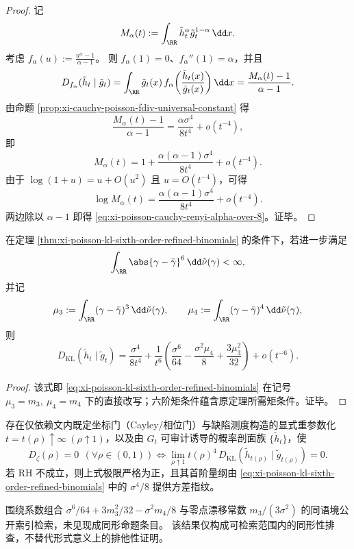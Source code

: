 \begin{proof}
记
\[
M_\alpha(t):=\int_{\RR}\tilde h_t^\alpha\tilde g_t^{1-\alpha}\,\dd x.
\]
考虑 \(f_\alpha(u):=\frac{u^\alpha-1}{\alpha-1}\)。
则 \(f_\alpha(1)=0\)、\(f_\alpha''(1)=\alpha\)，并且
\[
D_{f_\alpha}(\tilde h_t\mid \tilde g_t)
=\int_{\RR}\tilde g_t(x)\,f_\alpha\!\left(\frac{\tilde h_t(x)}{\tilde g_t(x)}\right)\dd x
=\frac{M_\alpha(t)-1}{\alpha-1}.
\]
由命题 \ref{prop:xi-cauchy-poisson-fdiv-universal-constant} 得
\[
\frac{M_\alpha(t)-1}{\alpha-1}
=\frac{\alpha\sigma^4}{8t^4}+o(t^{-4}),
\]
即
\[
M_\alpha(t)=1+\frac{\alpha(\alpha-1)\sigma^4}{8t^4}+o(t^{-4}).
\]
由于 \(\log(1+u)=u+O(u^2)\) 且 \(u=O(t^{-4})\)，可得
\[
\log M_\alpha(t)
=\frac{\alpha(\alpha-1)\sigma^4}{8t^4}+o(t^{-4}).
\]
两边除以 \(\alpha-1\) 即得 \eqref{eq:xi-poisson-cauchy-renyi-alpha-over-8}。证毕。
\end{proof}

\begin{corollary}[KL 六阶精化的中心矩记号重写]\label{cor:xi-poisson-cauchy-kl-tminus6-mu34-form}
在定理 \ref{thm:xi-poisson-kl-sixth-order-refined-binomials} 的条件下，若进一步满足
\[
\int_{\RR}\abs{\gamma-\bar\gamma}^6\,\dd\tilde\nu(\gamma)<\infty,
\]
并记
\[
\mu_3:=\int_{\RR}(\gamma-\bar\gamma)^3\,\dd\tilde\nu(\gamma),\qquad
\mu_4:=\int_{\RR}(\gamma-\bar\gamma)^4\,\dd\tilde\nu(\gamma),
\]
则
\begin{equation}\label{eq:xi-poisson-cauchy-kl-tminus6-mu34-form}
D_{\mathrm{KL}}(\tilde h_t\mid \tilde g_t)
=\frac{\sigma^4}{8t^4}
+\frac{1}{t^6}\left(
\frac{\sigma^6}{64}
-\frac{\sigma^2\mu_4}{8}
+\frac{3\mu_3^2}{32}
\right)
+o(t^{-6}).
\end{equation}
\end{corollary}

\begin{proof}
该式即 \eqref{eq:xi-poisson-kl-sixth-order-refined-binomials} 在记号
\(
\mu_3=m_3,\ \mu_4=m_4
\)
下的直接改写；六阶矩条件蕴含原定理所需矩条件。证毕。
\end{proof}

\begin{conjecture}\label{conj:xi-jensen-poisson-defect-alignment-refined}
存在仅依赖文内既定坐标门（Cayley/相位门）与缺陷测度构造的显式重参数化
\(
t=t(\rho)\uparrow\infty\ (\rho\uparrow1)
\)，以及由 \(G_t\) 可审计诱导的概率剖面族 \(\{\tilde h_t\}\)，使
\begin{equation}\label{eq:xi-jensen-poisson-defect-alignment-refined}
D_\zeta(\rho)=0\ \ (\forall \rho\in(0,1))
\Longleftrightarrow
\lim_{\rho\uparrow1}t(\rho)^4\,D_{\mathrm{KL}}(\tilde h_{t(\rho)}\mid \tilde g_{t(\rho)})=0.
\end{equation}
若 RH 不成立，则上式极限严格为正，且其首阶量纲由
\eqref{eq:xi-poisson-kl-sixth-order-refined-binomials}
中的 \(\sigma^4/8\) 提供方差指纹。
\end{conjecture}

\begin{remark}[同形公开检索说明]\label{rem:xi-poisson-refined-sixth-order-public-index-check}
围绕系数组合
\(
\sigma^6/64+3m_3^2/32-\sigma^2m_4/8
\)
与零点漂移常数
\(
m_3/(3\sigma^2)
\)
的同语境公开索引检索，未见现成同形命题条目。
该结果仅构成可检索范围内的同形性排查，不替代形式意义上的排他性证明。
\end{remark}

\endinput
